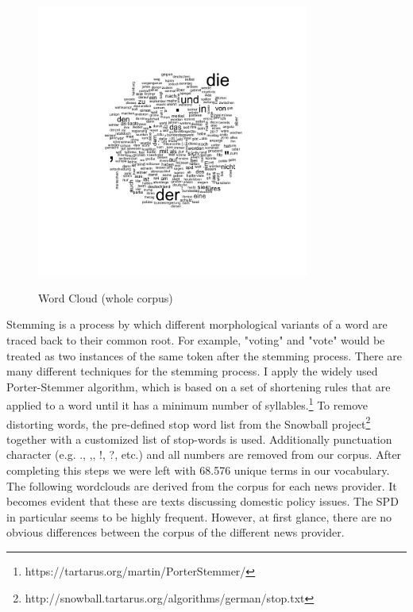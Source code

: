 \documentclass[12pt,a4paper,notitlepage]{article}
\begin{document}
\begin{figure}[H]
	\caption{Word Cloud (whole corpus)}
	\begin{center}
		\includegraphics[width=0.8\textwidth]{../figs/wordcloud.png}
		\label{fig_wordcloud1}
	\end{center}
\end{figure}

Stemming is a process by which different morphological variants of a word are traced back to their common root. For example, "voting" and "vote" would be treated as two instances of the same token after the stemming process. There are many different techniques for the stemming process. I apply the widely used Porter-Stemmer algorithm, which is based on a set of shortening rules that are applied to a word until it has a minimum number of syllables.\footnote{https://tartarus.org/martin/PorterStemmer/} To remove distorting words, the pre-defined stop word list from the Snowball project\footnote{http://snowball.tartarus.org/algorithms/german/stop.txt} together with a customized list of stop-words is used. Additionally punctuation character (e.g. ., ,, !, ?, etc.) and all numbers are removed from our corpus. After completing this steps we were left with 68.576 unique terms in our vocabulary. The following wordclouds are derived from the corpus for each news provider. It becomes evident that these are texts discussing domestic policy issues. The SPD in particular seems to be highly frequent. However, at first glance, there are no obvious differences between the corpus of the different news provider.  
\end{document}
